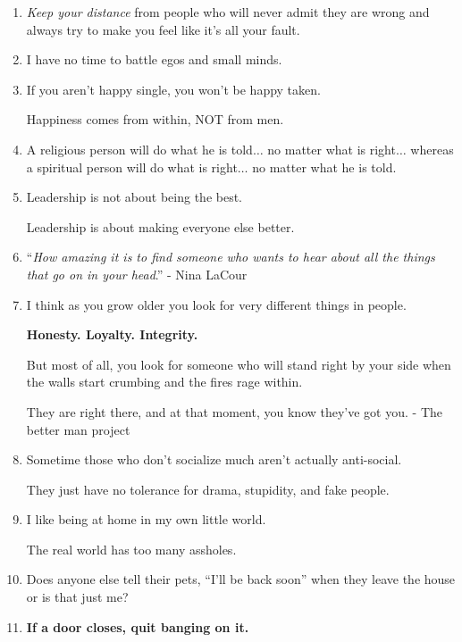\documentclass{article}
\numberwithin{equation}{section}
\begin{document}
\begin{enumerate}
    \textit{People will teach you how to grow by remaining stagnant}.
    
    \textit{Pay attention when you're going through painful and mysterious times}.
    
    \textit{Listen to the wisdom life is trying to teach you}. - Meredith Marple
    \item \textit{Keep your distance} from people who will never admit they are wrong and always try to make you feel like it's all your fault.
    \item I have no time to battle egos and small minds.
    \item If you aren't happy single, you won't be happy taken.
    
    Happiness comes from within, NOT from men.
    \item A religious person will do what he is told$\ldots$ no matter what is right$\ldots$ whereas a spiritual person will do what is right$\ldots$ no matter what he is told.
    \item Leadership is not about being the best.
    
    Leadership is about making everyone else better.
    \item ``\textit{How amazing it is to find someone who wants to hear about all the things that go on in your head}.'' - Nina LaCour
    \item I think as you grow older you look for very different things in people.
    
    \textbf{Honesty. Loyalty. Integrity.}
    
    But most of all, you look for someone who will stand right by your side when the walls start crumbing and the fires rage within.
    
    They are right there, and at that moment, you know they've got you. - The better man project
    \item Sometime those who don't socialize much aren't actually anti-social.
    
    They just have no tolerance for drama, stupidity, and fake people.
    \item I like being at home in my own little world.
    
    The real world has too many assholes.
    \item Does anyone else tell their pets, ``I'll be back soon'' when they leave the house or is that just me?
    \item \textbf{If a door closes, quit banging on it.}
    

\end{enumerate}
\end{document}
